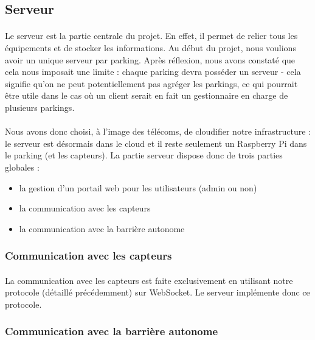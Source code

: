 \subsection{Serveur}


\paragraph*{}
Le serveur est la partie centrale du projet. En effet, il permet de relier tous les équipements et de stocker les informations. Au début du projet, nous voulions avoir un unique serveur par parking. Après réflexion, nous avons constaté que cela nous imposait une limite : chaque parking devra posséder un serveur - cela signifie qu'on ne peut potentiellement pas agréger les parkings, ce qui pourrait être utile dans le cas où un client serait en fait un gestionnaire en charge de plusieurs parkings.


\paragraph*{}
Nous avons donc choisi, à l'image des télécoms, de cloudifier notre infrastructure : le serveur est désormais dans le cloud et il reste seulement un Raspberry Pi dans le parking (et les capteurs).
La partie serveur dispose donc de trois parties globales :

\begin{itemize}
    \item la gestion d'un portail web pour les utilisateurs (admin ou non)
    \item la communication avec les capteurs
    \item la communication avec la barrière autonome
\end{itemize}



\subsubsection*{Communication avec les capteurs}

\paragraph*{}
La communication avec les capteurs est faite exclusivement en utilisant notre protocole (détaillé précédemment) sur WebSocket. Le serveur implémente donc ce protocole.


\subsubsection*{Communication avec la barrière autonome}

